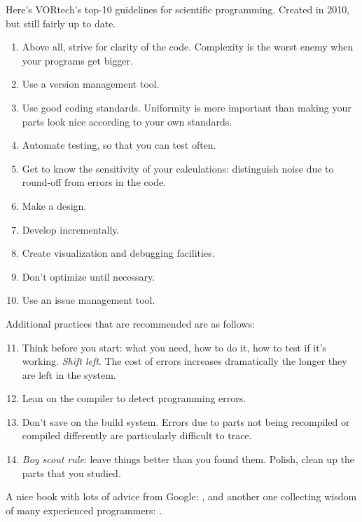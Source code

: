 \documentclass[12pt]{report}
\begin{document}
Here's VORtech's top-10 guidelines for scientific programming. Created in
2010, but still fairly up to date.
\begin{enumerate}
\item\label{itm:clarity} Above all, strive for clarity of the code.
        Complexity is the worst enemy when your programs get bigger.
\item\label{itm:version_mngmt} Use a version management tool.
\item\label{itm:coding_std} Use good coding standards. Uniformity is more
        important than making your parts look nice according to your own
        standards. 
\item\label{itm:automate_testing} Automate testing, so that you can test
        often.
\item\label{itm:know_sensitivity} Get to know the sensitivity of your
        calculations: distinguish noise due to round-off from errors in
        the code.
\item\label{itm:design} Make a design.
\item Develop incrementally.
\item\label{itm:debug_facility} Create visualization and debugging facilities.
\item\label{itm:dont_optimize} Don't optimize until necessary.
\item Use an issue management tool.
\end{enumerate}
Additional practices that are recommended are as follows:
\begin{enumerate}\setcounter{enumi}{10}
\item\label{itm:think_early} Think before you start: what you need, how to
        do it, how to test if it's working. {\em Shift left\/}. The cost of
        errors increases dramatically the longer they are left in the system.
\item\label{itm:lean_on_compiler} Lean on the compiler to detect
        programming errors.
\item\label{itm:build_system} Don't save on the build system. Errors due to
        parts not being recompiled or compiled differently are particularly
        difficult to trace.
\item {\em Boy scout rule}: leave things better than you found them. Polish,
        clean up the parts that you studied. %
\end{enumerate}
A nice book with lots of advice from Google: \cite{Winters2020}, and
another one collecting wisdom of many experienced programmers:
\cite{Henney2010}.
\end{document}
